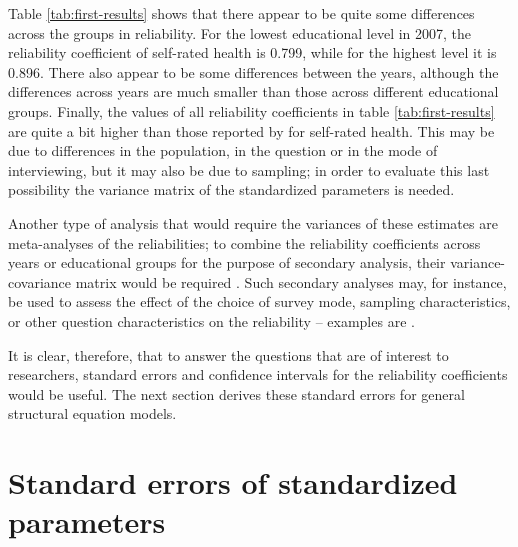 \documentclass[a4paper,11pt]{article}
\newcommand{\0}{\boldsymbol{0}}
\begin{document}
Table \ref{tab:first-results} shows that there appear to be quite some differences across the groups in reliability. 
For the lowest educational level in 2007, the reliability coefficient of self-rated health is 0.799, while for the highest level it is 0.896.
There also appear to be some differences between the years, although the differences across years are much smaller than those across
different educational groups. Finally, the values of all reliability coefficients in table \ref{tab:first-results} are quite a bit higher than those reported by \cite{lundberg1996assessing} 
for self-rated health. This may be due to differences in the population, in the question or in the mode of interviewing, but it may also be due to sampling; in order to evaluate this last possibility the variance matrix of the standardized parameters is needed. 

Another type of analysis that would require the variances of these estimates are meta-analyses of the reliabilities;
to combine the reliability coefficients across years or educational groups for the purpose of secondary analysis, 
their variance-covariance matrix would be required  \citep[261, 271-2]{cooper2009handbook}.
Such secondary analyses may, for instance, be used to assess the effect of the choice of survey mode, sampling characteristics, or
other question characteristics on the reliability  --
examples are 
\cite{andrews_construct_1984,scherpenzeel_validity_1997,saris_estimation_2007,alwin_margins_2007}. 


It is clear, therefore, that to answer the questions that are of interest to  researchers, standard errors and confidence intervals for the 
reliability coefficients would be useful. The next section derives these standard errors for general structural equation models. 

\section{Standard errors of standardized parameters\label{sec:analytics}}
\end{document}
